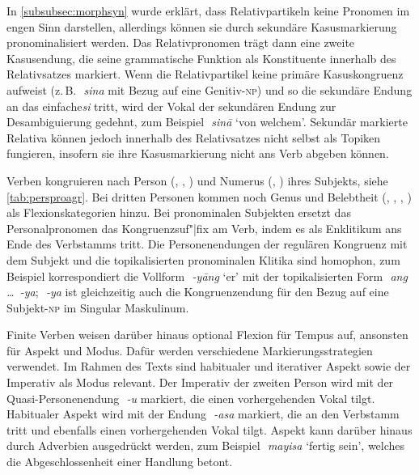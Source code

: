 \documentclass[
	12pt,
	ngerman,
]{scrartcl}
\newcommand{\zwsp}{\mbox{​}} %
\newcommand{\rayr}[2]{\zwsp\smash{{\Tagati #1}} \emph{#2}} %
\newcommand{\xayr}[3]{\zwsp\smash{\Tagati #1} \emph{#2} `#3'} %
\begin{document}

In \cref{subsubsec:morphsyn} wurde erklärt, dass Relativpartikeln keine
Pronomen im engen Sinn darstellen, allerdings können sie durch sekundäre
Kasusmarkierung pronominalisiert werden. Das Relativ\-pronomen trägt dann eine
zweite Kasusendung, die seine grammatische Funktion als Konstituente innerhalb
des Relativsatzes markiert. Wenn die Relativpartikel keine primäre
Kasuskongruenz aufweist (z.\,B. \rayr{sin}{sina} mit Bezug auf eine
Genitiv-\textsc{np}) und so die sekundäre Endung an das einfache \rayr{si}{si}
tritt, wird der Vokal der sekundären Endung zur Desambiguierung gedehnt, zum
Beispiel \xayr{sinaa}{sinā}{von welchem}. Sekundär markierte Relativa können
jedoch innerhalb des Relativsatzes nicht selbst als Topiken fungieren, insofern
sie ihre Kasusmarkierung nicht ans Verb abgeben können.


Verben kongruieren nach Person (\First, \Second, \Third) und Numerus (\Sg,
\Pl) ihres Subjekts, siehe \cref{tab:persproagr}. Bei dritten Personen kommen
noch Genus und Belebtheit (\M, \F, \N, \Inan) als Flexionskategorien hinzu. Bei
pronominalen Subjekten ersetzt das Personalpronomen das Kongruenzsuf"|fix am
Verb, indem es als Enklitikum ans Ende des Verbstamms tritt. Die
Personenendungen der regulären Kongruenz mit dem Subjekt und die
topikalisierten pronominalen Klitika sind homophon, zum Beispiel korrespondiert
die Vollform \xayr{/yaaNF}{-yāng}{er} mit der topikalisierten Form
\rayr{ANF—/y}{ang \dots\ -ya}; \rayr{/y}{-ya} ist gleichzeitig auch die
Kongruenzendung für den Bezug auf eine Subjekt-\textsc{np} im Singular
Maskulinum.

Finite Verben weisen darüber hinaus optional Flexion für Tempus auf, ansonsten
für Aspekt und Modus. Dafür werden verschiedene Markierungsstrategien
verwendet. Im Rahmen des Texts sind habitualer und iterativer Aspekt sowie der
Imperativ als Modus relevant. Der Imperativ der zweiten Person wird mit der
Quasi-Personenendung \rayr{/U}{-u} markiert, die einen vorhergehenden Vokal
tilgt. Habitualer Aspekt wird mit der Endung \rayr{/As}{-asa} markiert, die an
den Verbstamm tritt und ebenfalls einen vorhergehenden Vokal tilgt. Aspekt kann
darüber hinaus durch Adverbien ausgedrückt werden, zum Beispiel
\xayr{myis}{mayisa}{fertig sein}, welches die Abgeschlossenheit einer Handlung
betont.
\end{document}
